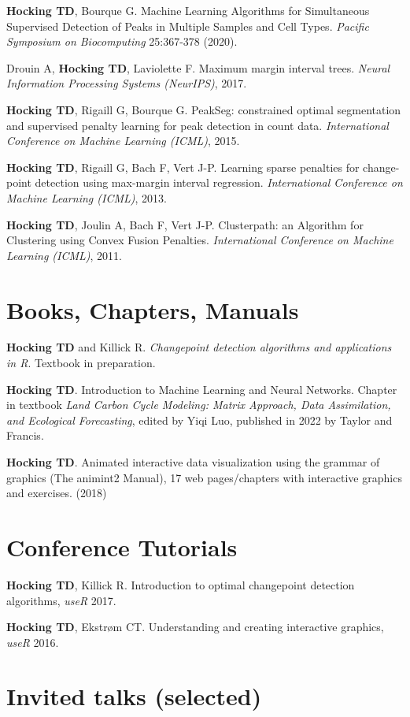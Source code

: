 \documentclass[margin,line]{res}
\begin{document}
\begin{resume}
{\bf Hocking TD}, Bourque G. Machine Learning Algorithms for
Simultaneous Supervised Detection of Peaks in Multiple Samples and
Cell Types. {\it Pacific Symposium on Biocomputing} 25:367-378 (2020).

Drouin A, {\bf Hocking TD}, Laviolette F. Maximum margin interval
trees. {\it Neural Information Processing Systems (NeurIPS)}, 2017.

{\bf Hocking TD}, Rigaill G, Bourque G. PeakSeg: constrained optimal
segmentation and supervised penalty learning for peak detection in
count data. {\it International Conference on Machine Learning (ICML)},
2015.

{\bf Hocking TD}, Rigaill G, Bach F, Vert J-P. Learning sparse
penalties for change-point detection using max-margin interval
regression. {\it International Conference on Machine Learning (ICML)}, 2013.

{\bf Hocking TD}, Joulin A, Bach F, Vert J-P. Clusterpath: an
Algorithm for Clustering using Convex Fusion Penalties. {\it International Conference on Machine Learning (ICML)}, 2011.

\section{\sc Books, Chapters, Manuals}

{\bf Hocking TD} and Killick R. {\it Changepoint detection algorithms
  and applications in R}. Textbook in preparation.

{\bf Hocking TD}. Introduction to Machine Learning and Neural
Networks. Chapter in textbook {\it Land Carbon Cycle Modeling: Matrix
  Approach, Data Assimilation, and Ecological Forecasting}, edited by
Yiqi Luo, published in 2022 by Taylor and Francis.

{\bf Hocking TD}. Animated interactive data visualization using the
grammar of graphics (The animint2 Manual), 17 web pages/chapters with
interactive graphics and exercises. (2018)

\section{\sc Conference Tutorials}

{\bf Hocking TD}, Killick R. Introduction to optimal changepoint
detection algorithms, {\it useR} 2017.

{\bf Hocking TD}, Ekstr\o m CT. Understanding and creating interactive
graphics, {\it useR} 2016.

\section{\sc Invited talks (selected)}


\end{resume}
\end{document}
